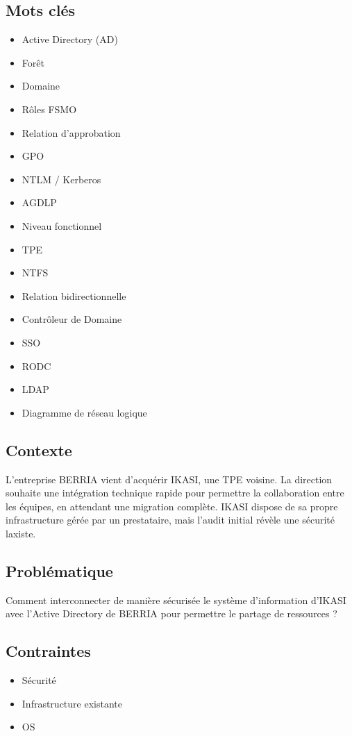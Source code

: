 \subsection*{Mots clés}
{}
\begin{itemize}
	\item Active Directory (AD)
	\item Forêt
	\item Domaine
	\item Rôles FSMO
	\item Relation d'approbation
	\item GPO
	\item NTLM / Kerberos
	\item AGDLP
	\item Niveau fonctionnel
	\item TPE
	\item NTFS
	\item Relation bidirectionnelle
	\item Contrôleur de Domaine
	\item SSO
	\item RODC
	\item LDAP
	\item Diagramme de réseau logique
\end{itemize}

\subsection*{Contexte}
{}
\noindent L'entreprise BERRIA vient d'acquérir IKASI, une TPE voisine. La direction souhaite une intégration technique rapide pour permettre la collaboration entre les équipes, en attendant une migration complète. IKASI dispose de sa propre infrastructure gérée par un prestataire, mais l'audit initial révèle une sécurité laxiste.

\subsection*{Problématique}
{}
\noindent Comment interconnecter de manière sécurisée le système d'information d'IKASI avec l'Active Directory de BERRIA pour permettre le partage de ressources ?

\subsection*{Contraintes}
{}
\begin{itemize}
	\item Sécurité
	\item Infrastructure existante
	\item OS
\end{itemize}

